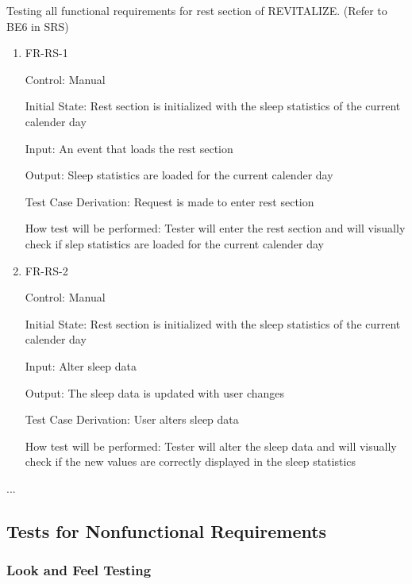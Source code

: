 \documentclass[12pt, titlepage]{article}
\begin{document}
Testing all functional requirements for rest section of REVITALIZE. (Refer to BE6 in SRS)

\begin{enumerate}

\item{FR-RS-1\\}

Control: Manual
					
Initial State: Rest section is initialized with the sleep statistics of the current calender day
					
Input: An event that loads the rest section
					
Output: Sleep statistics are loaded for the current calender day

Test Case Derivation: Request is made to enter rest section

How test will be performed: Tester will enter the rest section and will visually check if slep statistics are loaded for the current calender day
					
\item{FR-RS-2 \\}

Control: Manual
					
Initial State: Rest section is initialized with the sleep statistics of the current calender day
					
Input: Alter sleep data
					
Output: The sleep data is updated with user changes

Test Case Derivation: User alters sleep data

How test will be performed: Tester will alter the sleep data and will visually check if the new values are correctly displayed in the sleep statistics

\end{enumerate}
...

\subsection{Tests for Nonfunctional Requirements}



\subsubsection{Look and Feel Testing}
\end{document}
